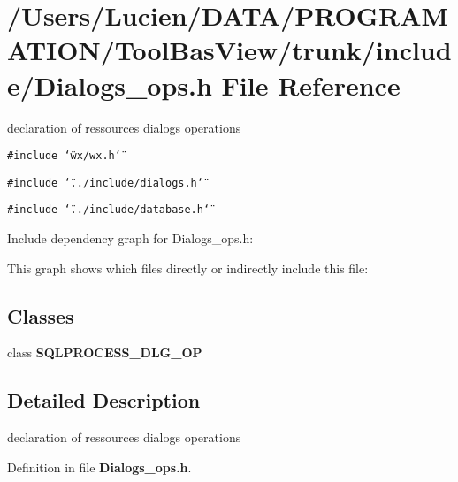\section{/Users/Lucien/DATA/PROGRAMATION/Tool\-Bas\-View/trunk/include/Dialogs\_\-ops.h File Reference}
\label{_dialogs__ops_8h}
declaration of ressources dialogs operations 

{\tt \#include \char`\"{}wx/wx.h\char`\"{}}\par
{\tt \#include \char`\"{}../include/dialogs.h\char`\"{}}\par
{\tt \#include \char`\"{}../include/database.h\char`\"{}}\par


Include dependency graph for Dialogs\_\-ops.h:

This graph shows which files directly or indirectly include this file:\subsection*{Classes}
\begin{CompactItemize}
\item 
class {\bf SQLPROCESS\_\-DLG\_\-OP}
\end{CompactItemize}


\subsection{Detailed Description}
declaration of ressources dialogs operations 



Definition in file {\bf Dialogs\_\-ops.h}.